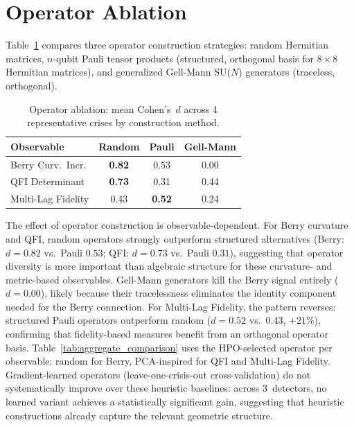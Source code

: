 \documentclass[3p]{elsarticle}
\begin{document}
\section{Operator Ablation}\label{sec:operator_ablation_appendix}

Table~\ref{tab:operator_ablation} compares three operator construction
strategies: random Hermitian matrices, $n$-qubit Pauli tensor products
(structured, orthogonal basis for $8 \times 8$ Hermitian matrices), and
generalized Gell-Mann SU($N$) generators (traceless, orthogonal).

\begin{table}[htb]
\centering
\caption{Operator ablation: mean Cohen's~$d$ across 4 representative
  crises by construction method.}
\label{tab:operator_ablation}
\small
\begin{tabular}{lccc}
\toprule
Observable & Random & Pauli & Gell-Mann \\
\midrule
Berry Curv.\ Incr. & \textbf{0.82} & 0.53 & 0.00 \\
QFI Determinant     & \textbf{0.73} & 0.31 & 0.44 \\
Multi-Lag Fidelity  & 0.43 & \textbf{0.52} & 0.24 \\
\bottomrule
\end{tabular}

\medskip
{}
\end{table}

The effect of operator construction is observable-dependent.
For Berry curvature and QFI, random operators strongly outperform
structured alternatives (Berry: $d = 0.82$ vs.\ Pauli $0.53$;
QFI: $d = 0.73$ vs.\ Pauli $0.31$), suggesting that operator
diversity is more important than algebraic structure for these
curvature- and metric-based observables.  Gell-Mann generators kill
the Berry signal entirely ($d = 0.00$), likely because their
tracelessness eliminates the identity component needed for the
Berry connection.  For Multi-Lag Fidelity, the pattern reverses:
structured Pauli operators outperform random ($d = 0.52$ vs.\
$0.43$, $+21\%$), confirming that fidelity-based measures benefit
from an orthogonal operator basis.  Table~\ref{tab:aggregate_comparison}
uses the HPO-selected operator per observable: random for Berry,
PCA-inspired for QFI and Multi-Lag Fidelity.
Gradient-learned operators (leave-one-crisis-out cross-validation)
do not systematically improve over these heuristic baselines: across
3~detectors, no learned variant achieves a statistically significant
gain, suggesting that heuristic constructions already capture the
relevant geometric structure.
\end{document}
